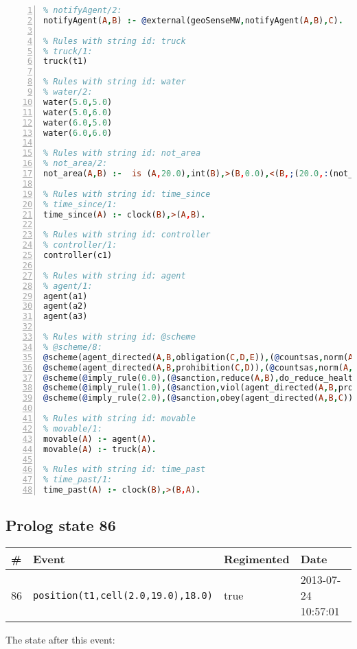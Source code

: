\documentclass[11pt]{article}\usepackage[utf8]{inputenc}\usepackage{geometry}
\begin{document}
\begin{lstlisting}[language=Prolog, numbers=left]
% Rules with string id: notifyAgent
% notifyAgent/2:
notifyAgent(A,B) :- @external(geoSenseMW,notifyAgent(A,B),C).

% Rules with string id: truck
% truck/1:
truck(t1)

% Rules with string id: water
% water/2:
water(5.0,5.0)
water(5.0,6.0)
water(6.0,5.0)
water(6.0,6.0)

% Rules with string id: not_area
% not_area/2:
not_area(A,B) :-  is (A,20.0),int(B),>(B,0.0),<(B,;(20.0,:(not_area(A,B), is (-(B),20.0)))),int(A),>(A,0.0),<(A,;(20.0,:(area(A,B),-(int(A))))),int(B),>(A,0.0),>(B,0.0),<(A,21.0),<(B,21.0).

% Rules with string id: time_since
% time_since/1:
time_since(A) :- clock(B),>(A,B).

% Rules with string id: controller
% controller/1:
controller(c1)

% Rules with string id: agent
% agent/1:
agent(a1)
agent(a2)
agent(a3)

% Rules with string id: @scheme
% @scheme/8:
@scheme(agent_directed(A,B,obligation(C,D,E)),(@countsas,norm(A,B,F,obligation(C,D,E)),F),false,(listTrue(C)),(time_past(D)),false,[plus(viol(agent_directed(A,B,obligation(C,D,E))))|[]],[plus(obey(agent_directed(A,B,obligation(C,D,E))))|[]])
@scheme(agent_directed(A,B,prohibition(C,D)),(@countsas,norm(A,B,E,prohibition(C,D)),E),(listTrue(C)),false,(false),false,[plus(viol(agent_directed(A,B,prohibition(C,D))))|[]],[plus(obey(agent_directed(A,B,prohibition(C,D))))|[]])
@scheme(@imply_rule(0.0),(@sanction,reduce(A,B),do_reduce_health(A,B),notifyAgent(A,changed(status))),true,false,false,false,[min(reduce(A,B))|[]],[])
@scheme(@imply_rule(1.0),(@sanction,viol(agent_directed(A,B,prohibition(C,D))),do_sanction(D)),true,false,false,false,[min(viol(agent_directed(A,B,prohibition(C,D))))|[]],[])
@scheme(@imply_rule(2.0),(@sanction,obey(agent_directed(A,B,C))),true,false,false,false,[min(obey(agent_directed(A,B,C)))|[]],[])

% Rules with string id: movable
% movable/1:
movable(A) :- agent(A).
movable(A) :- truck(A).

% Rules with string id: time_past
% time_past/1:
time_past(A) :- clock(B),>(B,A).

\end{lstlisting}
\clearpage 
\subsection{Prolog state 86}
\begin{table}[ht]
\centering 
\begin{tabular}{l l l l} 
\textbf{\#} & \textbf{Event} & \textbf{Regimented} & \textbf{Date} \\ [0.5ex] 
\hline
86&\texttt{position(t1,cell(2.0,19.0),18.0)}&true&2013-07-24 10:57:01\\ [1ex] \hline\end{tabular}
\end{table}
The state after this event:
\end{document}
